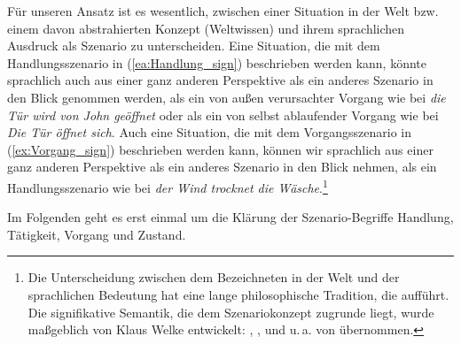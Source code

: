 Für unseren Ansatz ist es wesentlich, zwischen einer Situation in der Welt bzw. einem davon abstrahierten Konzept (Weltwissen) und ihrem sprachlichen Ausdruck als Szenario zu unterscheiden. Eine Situation, die mit dem Handlungsszenario in (\ref{ea:Handlung_sign}) beschrieben werden kann, könnte sprachlich auch aus einer ganz anderen Perspektive als ein anderes Szenario in den Blick genommen werden, \zB als ein von außen verursachter Vorgang wie bei \textit{die Tür wird von John geöffnet} oder als ein von selbst ablaufender Vorgang wie bei \textit{Die Tür öffnet sich}. Auch eine Situation, die mit dem Vorgangsszenario in (\ref{ex:Vorgang_sign}) beschrieben werden kann, können wir sprachlich aus einer ganz anderen Perspektive als ein anderes Szenario in den Blick nehmen, \zB als ein Handlungsszenario wie bei \textit{der Wind trocknet die Wäsche}.\footnote{Die Unterscheidung zwischen dem Bezeichneten in der Welt und der sprachlichen Bedeutung hat eine lange philosophische Tradition, die \citet[106]{Coseriu1970} aufführt. Die signifikative Semantik, die dem Szenariokonzept zugrunde liegt, wurde maßgeblich von Klaus Welke entwickelt: \citet[188--204]{Welke1988}, \citet[95--98]{Welke2005}, \citet[Kapitel 3]{Welke2019} und u.\,a. von \citet{Agel2017} übernommen.}

Im Folgenden geht es erst einmal um die Klärung der Szenario-Begriffe Handlung, Tätigkeit, Vorgang und Zustand.  

